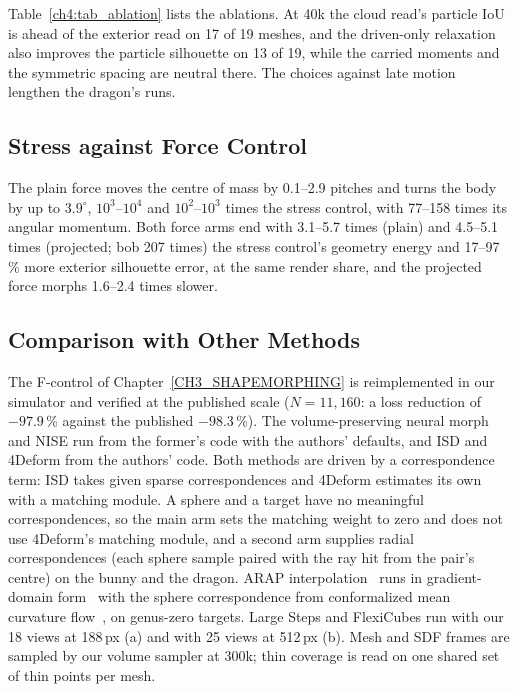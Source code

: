Table~\ref{ch4:tab_ablation} lists the ablations. At 40k the cloud read's particle IoU is ahead of the exterior read on 17 of 19
meshes, and the driven-only relaxation also improves the particle silhouette on 13 of 19, while the carried moments and the
symmetric spacing are neutral there. The choices against late motion lengthen the dragon's runs.

\subsection{Stress against Force Control}
The plain force moves the centre of mass by 0.1--2.9 pitches and turns the body by up to $3.9^\circ$, $10^3$--$10^4$ and
$10^2$--$10^3$ times the stress control, with 77--158 times its angular momentum. Both force arms end with 3.1--5.7 times
(plain) and 4.5--5.1 times (projected; bob 207 times) the stress control's geometry energy and 17--97\,\% more exterior
silhouette error, at the same render share, and the projected force morphs 1.6--2.4 times slower.

\subsection{Comparison with Other Methods}
\label{app:ch4_comparison}
The F-control of Chapter~\ref{CH3_SHAPEMORPHING} is reimplemented in our simulator and verified at the published scale
($N=11{,}160$: a loss reduction of $-97.9$\,\% against the published $-98.3$\,\%). The volume-preserving neural morph and NISE
run from the former's code with the authors' defaults, and ISD and 4Deform from the authors' code. Both methods are driven
by a correspondence term: ISD takes given sparse correspondences and 4Deform estimates its own with a matching module. A sphere
and a target have no meaningful correspondences, so the main arm sets the matching weight to zero and does not use 4Deform's
matching module, and a second arm supplies radial correspondences (each sphere sample paired with the ray hit from the pair's
centre) on the bunny and the dragon. ARAP interpolation~\citep{2000-ARAPShapeInterpolation} runs in gradient-domain form~\citep{sumner2004deftransfer,2005-PoissonShapeInterpolation} with
the sphere correspondence from conformalized mean curvature flow~\citep{kazhdan2012cmcf}, on genus-zero targets. Large Steps and
FlexiCubes run with our 18 views at 188\,px (a) and with 25 views at 512\,px (b). Mesh and SDF frames are sampled by our volume
sampler at 300k; thin coverage is read on one shared set of thin points per mesh.

